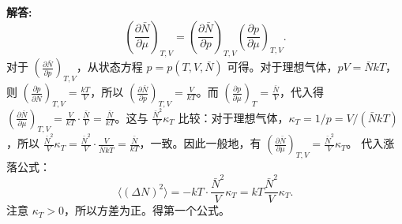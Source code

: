 \documentclass[12pt, a4paper, oneside]{ctexart}
\newenvironment{solution}{\par\noindent\textbf{解答:}\quad}{\par}
\begin{document}
\begin{solution}
    \[
    \left( \frac{\partial \bar{N}}{\partial \mu} \right)_{T,V} = \left( \frac{\partial \bar{N}}{\partial p} \right)_{T,V} \left( \frac{\partial p}{\partial \mu} \right)_{T,V}.
    \]
    对于 $\left( \frac{\partial \bar{N}}{\partial p} \right)_{T,V}$，从状态方程 $p = p(T, V, \bar{N})$ 可得。对于理想气体，$pV = \bar{N} kT$，则 $\left( \frac{\partial p}{\partial \bar{N}} \right)_{T,V} = \frac{kT}{V}$，所以 $\left( \frac{\partial \bar{N}}{\partial p} \right)_{T,V} = \frac{V}{kT}$。而 $\left( \frac{\partial p}{\partial \mu} \right)_T = \frac{\bar{N}}{V}$，代入得 $\left( \frac{\partial \bar{N}}{\partial \mu} \right)_{T,V} = \frac{V}{kT} \cdot \frac{\bar{N}}{V} = \frac{\bar{N}}{kT}$。这与 $\frac{\bar{N}^2}{V} \kappa_T$ 比较：对于理想气体，$\kappa_T = 1/p = V/(\bar{N} kT)$，所以 $\frac{\bar{N}^2}{V} \kappa_T = \frac{\bar{N}^2}{V} \cdot \frac{V}{\bar{N} kT} = \frac{\bar{N}}{kT}$，一致。因此一般地，有 $\left( \frac{\partial \bar{N}}{\partial \mu} \right)_{T,V} = \frac{\bar{N}^2}{V} \kappa_T$。
    代入涨落公式：
    \[
    \langle (\Delta N)^2 \rangle = -kT \cdot \frac{\bar{N}^2}{V} \kappa_T = kT \frac{\bar{N}^2}{V} \kappa_T.
    \]
    注意 $\kappa_T > 0$，所以方差为正。得第一个公式。


\end{solution}
\end{document}
